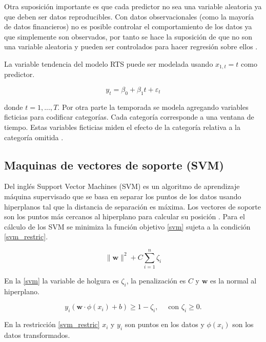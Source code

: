 Otra suposición importante es que cada predictor no sea una variable aleatoria ya que deben ser datos reproducibles. Con datos observacionales (como la mayoría de datos financieros) no es posible controlar el comportamiento de los datos ya que simplemente son observados, por tanto se hace la suposición de que no son una variable aleatoria y pueden ser controlados para hacer regresión sobre ellos \parencite{hyndmanForecastingPrinciplesPractice2018}.

La variable tendencia del modelo RTS puede ser modelada usando $x_{1, t}=t$ como predictor.

\[
y_{t}=\beta_{0}+\beta_{1} t+\varepsilon_{t}
\]

donde $t=1,...,T$. Por otra parte la temporada se modela agregando variables ficticias para codificar categorías. Cada categoría corresponde a una ventana de tiempo. Estas variables ficticias miden el efecto de la categoría relativa a la categoría omitida \parencite{hyndmanForecastingPrinciplesPractice2018}. 

\subsection{Maquinas de vectores de soporte (SVM)}

Del inglés Support Vector Machines (SVM) es un algoritmo de aprendizaje máquina supervisado que se basa en separar los puntos de los datos usando hiperplanos tal que la distancia de separación es máxima. Los vectores de soporte son los puntos más cercanos al hiperplano para calcular su posición \parencite{mudassirTimeseriesForecastingBitcoin2020}.
Para el cálculo de los SVM se minimiza la función objetivo \ref{svm} sujeta a la condición \ref{svm_restric}.

\begin{equation}
	\|\mathbf{w}\|^{2}+C \sum_{i=1}^{n} \zeta_{i}
	\label{svm}
\end{equation}

En la \autoref{svm} la variable de holgura es $\zeta_{i}$, la penalización es $C$ y $\mathbf{w}$ es la normal al hiperplano.

\begin{equation}
	y_{i}\left(\mathbf{w} \cdot \phi\left(x_{i}\right)+b \right) \geq 1-\zeta_{i}, \quad \text { con } \zeta_{i} \geq 0.
	\label{svm_restric}
\end{equation}

En la restricción \ref{svm_restric} $x_i$ y $y_i$ son puntos en los datos y $\phi(x_i)$ son los datos transformados. 


